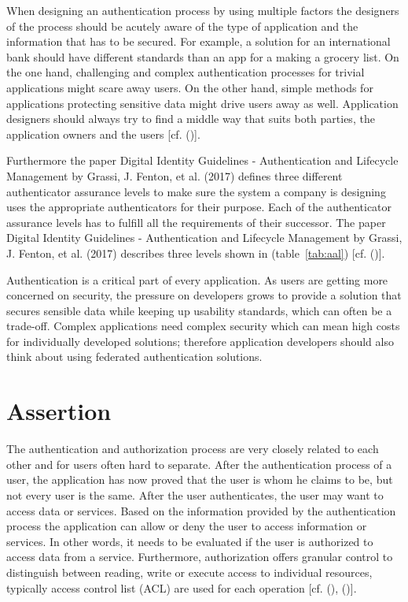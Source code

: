 When designing an authentication process by using multiple factors the designers of the process should be acutely aware of the type of application and the information that has to be secured. For example, a solution for an international bank should have different standards than an app for a making a grocery list. On the one hand, challenging and complex authentication processes for trivial applications might scare away users. On the other hand, simple methods for applications protecting sensitive data might drive users away as well. Application designers should always try to find a middle way that suits both parties, the application owners and the users [cf. (\cite{NIST:2017:DIG})]. 

Furthermore the paper Digital Identity Guidelines - Authentication and Lifecycle Management by Grassi, J. Fenton, et al. (2017) defines three different authenticator assurance levels to make sure the system a company is designing uses the appropriate authenticators for their purpose. Each of the authenticator assurance levels has to fulfill all the requirements of their successor. The paper Digital Identity Guidelines - Authentication and Lifecycle Management by  Grassi, J. Fenton, et al. (2017) describes three levels shown in (table~\ref{tab:aal}) [cf. (\cite{NIST:2017:DIGAL})].



Authentication is a critical part of every application. As users are getting more concerned on security, the pressure on developers grows to provide a solution that secures sensible data while keeping up usability standards, which can often be a trade-off. Complex applications need complex security which can mean high costs for individually developed solutions; therefore application developers should also think about using federated authentication solutions.


\section{Assertion}
\label{assertion}
The authentication and authorization process are very closely related to each other and for users often hard to separate. After the authentication process of a user, the application has now proved that the user is whom he claims to be, but not every user is the same. After the user authenticates, the user may want to access data or services. Based on the information provided by the authentication process the application can allow or deny the user to access information or services. In other words, it needs to be evaluated if the user is authorized to access data from a service. Furthermore, authorization offers granular control to distinguish between reading, write or execute access to individual resources, typically access control list (ACL) are used for each operation [cf. (\cite{Todorov:2007:MUI}), (\cite{Boyed:2012:GSOA})].

